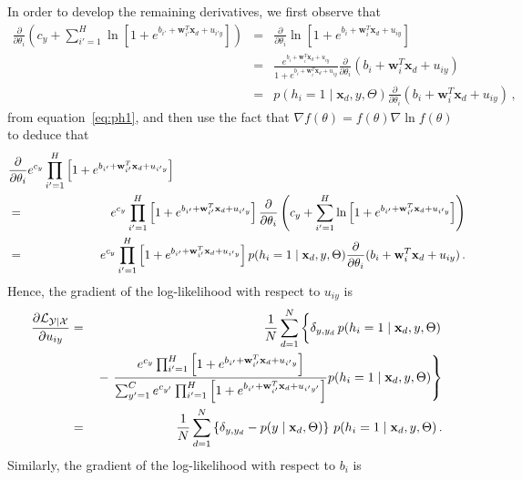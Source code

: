 \documentclass[a4paper]{article}
\renewcommand{\v}[1]{\mathbf{#1}}
\renewcommand{\c}[1]{{\cal #1}}
\begin{document}
In order to develop the remaining derivatives, we first observe that
\begin{eqnarray}
\frac{\partial}{\partial\theta_i}\left(
c_{y}+\sum_{i'=1}^{H}\ln\left[1+e^{b_{i'}+ \v{w}_{i'}^T\v{x}_d+u_{i'y}}\right]
\right)
&=&
\frac{\partial}{\partial\theta_i}\ln\left[1+e^{b_{i}+ \v{w}_{i}^T\v{x}_d+u_{iy}}\right]
\nonumber\\&=&
\frac{e^{b_{i}+ \v{w}_{i}^T\v{x}_d+u_{iy}}}
{1+e^{b_{i}+ \v{w}_{i}^T\v{x}_d+u_{iy}}}
\frac{\partial}{\partial\theta_i}(b_{i}+ \v{w}_{i}^T\v{x}_d+u_{iy})
\nonumber\\&=&
p(h_i=1\;|\;\v{x}_d,y,\Theta)
\frac{\partial}{\partial\theta_i}(b_{i}+ \v{w}_{i}^T\v{x}_d+u_{iy})\,,
\end{eqnarray}
from equation~\eqref{eq:ph1},
and then use the fact that 
$\nabla f(\theta)=f(\theta)\nabla\ln f(\theta)$ to deduce that
\begin{eqnarray}
&\frac{\partial}{\partial\theta_i}e^{c_{y}}\prod_{i'=1}^{H}\left[1+e^{b_{i'}+ \v{w}_{i'}^T\v{x}_d+u_{i'y}}\right]&
\nonumber\\&=&\hspace*{-25mm}
e^{c_{y}}\prod_{i'=1}^{H}\left[1+e^{b_{i'}+ \v{w}_{i'}^T\v{x}_d+u_{i'y}}\right]
\frac{\partial}{\partial\theta_i}\left(
c_{y}+\sum_{i'=1}^{H}\ln\left[1+e^{b_{i'}+ \v{w}_{i'}^T\v{x}_d+u_{i'y}}\right]
\right)
\nonumber\\&=&\hspace*{-25mm}
e^{c_{y}}\prod_{i'=1}^{H}\left[1+e^{b_{i'}+ \v{w}_{i'}^T\v{x}_d+u_{i'y}}\right]
p(h_i=1\;|\;\v{x}_d,y,\Theta)
\frac{\partial}{\partial\theta_i}(b_{i}+ \v{w}_{i}^T\v{x}_d+u_{iy})\,.
\end{eqnarray}
Hence, the gradient of the log-likelihood with respect to $u_{iy}$ is
\begin{eqnarray}
\frac{\partial\c{L}_{\c{Y}|\c{X}}}{\partial u_{iy}}
& = & 
\frac{1}{N}\sum_{d=1}^N\left\{\rule{0pt}{5mm}
\delta_{y,y_d}\,p(h_i=1\;|\;\v{x}_d,y,\Theta)\right.
\nonumber\\&&
{}-\left.\frac{e^{c_{y}}\prod_{i'=1}^{H}\left[1+e^{b_{i'}+ \v{w}_{i'}^T\v{x}_d+u_{i'y}}\right]}
{\sum_{y'=1}^{C}e^{c_{y'}}\prod_{i'=1}^{H}\left[1+e^{b_{i'}+ \v{w}_{i'}^T\v{x}_d+u_{i'y'}}\right]}
p(h_i=1\;|\;\v{x}_d,y,\Theta)
\right\}
\nonumber\\&=&
\frac{1}{N}\sum_{d=1}^N\left\{
\delta_{y,y_d}-p(y\;|\;\v{x}_d,\Theta)\right\}\,p(h_i=1\;|\;\v{x}_d,y,\Theta)
\,.
\end{eqnarray}
Similarly, the gradient of the log-likelihood with respect to $b_{i}$ is
\end{document}
